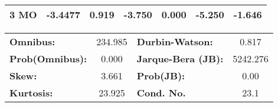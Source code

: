 \begin{center}
\begin{tabular}{lcccccc}
\textbf{3 MO}      &      -3.4477  &        0.919     &    -3.750  &         0.000        &       -5.250    &       -1.646     \\
\bottomrule
\end{tabular}
\begin{tabular}{lclc}
\textbf{Omnibus:}       & 234.985 & \textbf{  Durbin-Watson:     } &    0.817  \\
\textbf{Prob(Omnibus):} &   0.000 & \textbf{  Jarque-Bera (JB):  } & 5242.276  \\
\textbf{Skew:}          &   3.661 & \textbf{  Prob(JB):          } &     0.00  \\
\textbf{Kurtosis:}      &  23.925 & \textbf{  Cond. No.          } &     23.1  \\
\bottomrule
\end{tabular}
\end{center}

